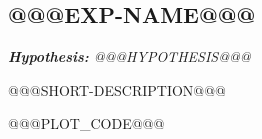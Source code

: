 \subsection{@@@EXP-NAME@@@}

	\textit{\textbf{Hypothesis:} @@@HYPOTHESIS@@@}
	\vspace{0.5cm}

	@@@SHORT-DESCRIPTION@@@

	@@@PLOT_CODE@@@


